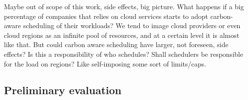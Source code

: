 Maybe out of scope of this work, side effects, big picture.
What happens if a big percentage of companies that relies on cloud services starts to adopt carbon-aware scheduling of their workloads?
We tend to image cloud providers or even cloud regions as an infinite pool of resources, and at a certain level it is almost like that. But could carbon aware scheduling have larger, not foreseen, side effects?
Is this a responsibility of who schedules? Shall schedulers be responsible for the load on regions? Like self-imposing some sort of limits/caps.

\subsection{Preliminary evaluation}

\begin{comment}
for the purpose of this theses

boavizta API simulation

assumptions
- analysis limited to only cloud VM, (aligned with the scope of this theses)
- data related to GCP is not data from boavizta (even if gcp is supported in our current system) but mapped from azure and aws

limitations
- whole countries, not regions


not easily integratable in a real production system due to its quite restrictive license (AGPL 3)
it is still usable for research purposes like in this case.
\end{comment}






\newpage

